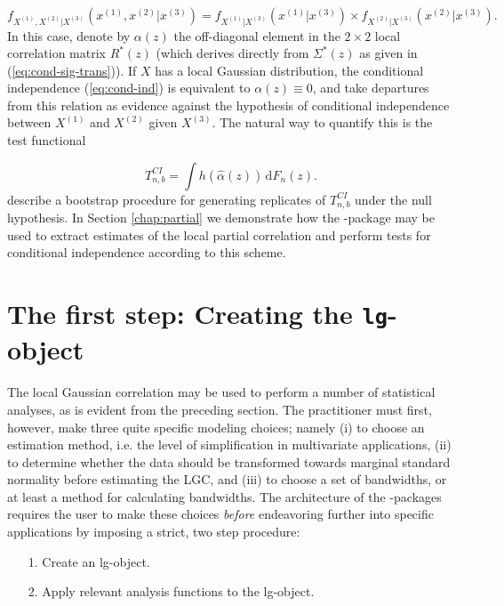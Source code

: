 \begin{equation}
f_{X^{(1)},X^{(2)}|X^{(3)}}\left(x^{(1)}, x^{(2)}|x^{(3)}\right) = f_{X^{(1)}|X^{(3)}}\left(x^{(1)}|x^{(3)}\right) \times f_{X^{(2)}|X^{(3)}}\left(x^{(2)}|x^{(3)}\right).
\label{eq:cond-ind}
\end{equation}
In this case, denote by $\alpha(z)$ the off-diagonal element in the $2\times2$ local correlation matrix $R^*(z)$ (which derives directly from $\Sigma^*(z)$ as given in (\ref{eq:cond-sig-trans})). If $X$ has a local Gaussian distribution, the conditional independence (\ref{eq:cond-ind}) is equivalent to $\alpha(z) \equiv 0$, and \citet{otne:tjos:2019} take departures from this relation as evidence against the hypothesis of conditional independence between $X^{(1)}$ and $X^{(2)}$ given $X^{(3)}$. The natural way to quantify this is the test functional

\begin{equation}
T^{CI}_{n, b} = \int h(\widehat\alpha(z)) \, \textrm{d}F_n(z).
\label{eq:ci-test-statistic}
\end{equation}
\citet{otne:tjos:2019} describe a bootstrap procedure for generating replicates of $T_{n,b}^{CI}$ under the null hypothesis. In Section \ref{chap:partial} we demonstrate how the -package may be used to extract estimates of the local partial correlation and perform tests for conditional independence according to this scheme.

\section{The first step: Creating the \texttt{lg}-object} 
\label{chap:lgobject}

The local Gaussian correlation may be used to perform a number of statistical analyses, as is evident from the preceding section. The practitioner must first, however, make three quite specific modeling choices; namely (i) to choose an estimation method, i.e. the level of simplification in multivariate applications, (ii) to determine whether the data should be transformed towards marginal standard normality before estimating the LGC, and (iii) to choose a set of bandwidths, or at least a method for calculating bandwidths. The architecture of the -packages requires the user to make these choices \emph{before} endeavoring further into specific applications by imposing a strict, two step procedure:

\begin{itemize}
\item[1.] Create an lg-object.
\item[2.] Apply relevant analysis functions to the lg-object.
\end{itemize}


